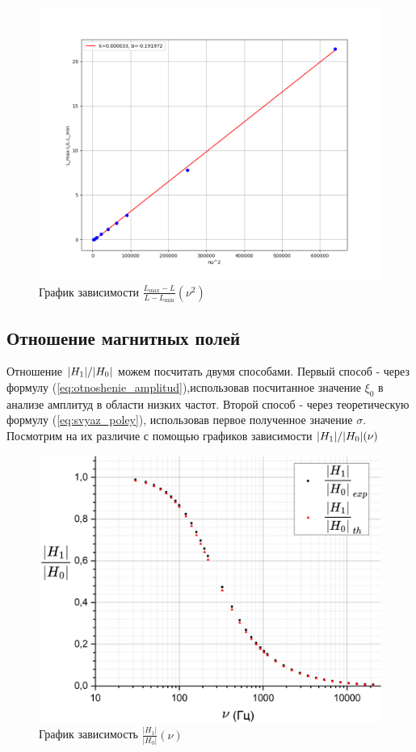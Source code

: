 \documentclass[a4paper, 12pt]{article}
\begin{document}
	\begin{figure}[h!]
		\centering
		\includegraphics[width=\textwidth]{data/data7}
		\caption{График зависимости $\frac{L_{\max} - L}{L - L_{\min}} (\nu^2)$}
	\end{figure}
	
	
	\subsection*{Отношение магнитных полей}
	Отношение $\abs{H_1}/\abs{H_0}$ можем посчитать двумя способами. Первый способ - через
	формулу (\ref{eq:otnoshenie_amplitud}),использовав посчитанное значение $\xi_0$ в анализе амплитуд в области низких частот.
	Второй способ - через теоретическую формулу (\ref{eq:svyaz_poley}), использовав первое полученное значение $\sigma$. Посмотрим на их различие с помощью графиков зависимости
	$\abs{H_1}/\abs{H_0} (\nu)$
	
	\begin{figure}[h]
		\centering
		\includegraphics[width=\textwidth]{pictures/Final}
		\caption{График зависимость $\frac{|H_1|}{|H_0|}(\nu)$}
	\end{figure}
	
\end{document}
